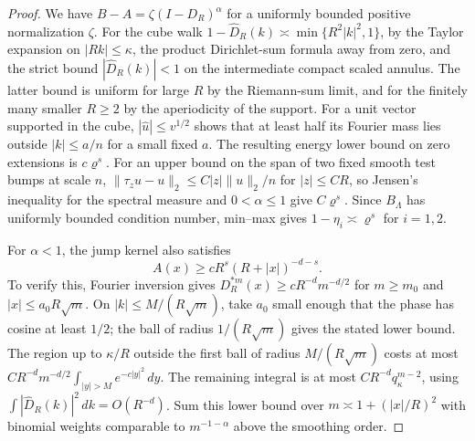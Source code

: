 \documentclass[11pt]{article}
\theoremstyle{definition}
\begin{document}
\begin{proof}
We have \(B-A=\zeta (I-D_R)^\alpha\) for a uniformly bounded positive
normalization \(\zeta\). For the cube walk
\(1-\widehat D_R(k)\asymp\min\{R^2|k|^2,1\}\), by the Taylor expansion
on \(|Rk|\le\kappa\), the product Dirichlet-sum formula away from
zero, and the strict bound \(|\widehat D_R(k)|<1\) on the intermediate
compact scaled annulus. The latter bound is uniform for large \(R\)
by the Riemann-sum limit, and for the finitely many smaller \(R\ge2\)
by the aperiodicity of the support. For a unit vector supported in the
cube, \(|\widehat u|\le v^{1/2}\) shows that at least half its Fourier
mass lies outside \(|k|\le a/n\) for a small fixed \(a\). The resulting
energy lower bound on zero extensions is \(c\varrho^s\). For an
upper bound on the span of two fixed smooth test bumps at scale \(n\),
\(\|\tau_z u-u\|_2\le C |z|\|u\|_2/n\) for \(|z|\le C R\),
so Jensen's inequality for the spectral measure and \(0<\alpha\le1\)
give \(C\varrho^s\). Since \(B_\Lambda\) has uniformly bounded
condition number, min--max gives \(1-\eta_i\asymp\varrho^s\) for
\(i=1,2\).

For \(\alpha<1\), the jump kernel also satisfies
\begin{equation}
 A(x)\ge c R^s(R+|x|)^{-d-s}.
\end{equation}
To verify this, Fourier inversion gives
\(D_R^{*m}(x)\ge c R^{-d}m^{-d/2}\) for \(m\ge m_0\) and
\(|x|\le a_0R\sqrt m\). On \(|k|\le M/(R\sqrt m)\), take \(a_0\)
small enough that the phase has cosine at least \(1/2\); the
ball of radius \(1/(R\sqrt m)\) gives the stated lower bound.
The region up to \(\kappa/R\) outside the first ball of radius
\(M/(R\sqrt m)\) costs at most
\(C R^{-d}m^{-d/2}\int_{|y|>M}e^{-c|y|^2}\,dy\).
The remaining integral is at most
\(C R^{-d}q_\kappa^{m-2}\), using
\(\int|\widehat D_R(k)|^2\,dk=O(R^{-d})\).
Sum this lower bound over \(m\asymp 1+(|x|/R)^2\) with
binomial weights comparable to \(m^{-1-\alpha}\) above the
smoothing order.


\end{proof}
\end{document}
